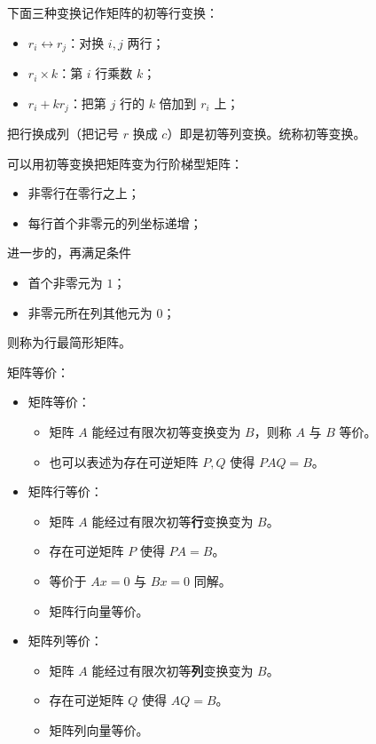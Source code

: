 下面三种变换记作矩阵的初等行变换：
\begin{itemize}
	\item $r_i \leftrightarrow r_j$：对换 $i, j$ 两行；
	\item $r_i \times k$：第 $i$ 行乘数 $k$；
	\item $r_i + kr_j$：把第 $j$ 行的 $k$ 倍加到 $r_i$ 上；
\end{itemize}
把行换成列（把记号 $r$ 换成 $c$）即是初等列变换。统称初等变换。

可以用初等变换把矩阵变为行阶梯型矩阵：
\begin{itemize}
	\item 非零行在零行之上；
	\item 每行首个非零元的列坐标递增；
\end{itemize}
进一步的，再满足条件
\begin{itemize}
	\item 首个非零元为 $1$；
	\item 非零元所在列其他元为 $0$；
\end{itemize}
则称为行最简形矩阵。

矩阵等价：
\begin{itemize}
	\item 矩阵等价：
	      \begin{itemize}
		      \item 矩阵 $A$ 能经过有限次初等变换变为 $B$，则称 $A$ 与 $B$ 等价。
		      \item 也可以表述为存在可逆矩阵 $P,Q$ 使得 $PAQ = B$。
	      \end{itemize}
	\item 矩阵行等价：
	      \begin{itemize}
		      \item 矩阵 $A$ 能经过有限次初等\textbf{行}变换变为 $B$。
		      \item 存在可逆矩阵 $P$ 使得 $PA = B$。
		      \item 等价于 $Ax=0$ 与 $Bx=0$ 同解。
		      \item 矩阵行向量等价。
	      \end{itemize}
	\item 矩阵列等价：
	      \begin{itemize}
		      \item 矩阵 $A$ 能经过有限次初等\textbf{列}变换变为 $B$。
		      \item 存在可逆矩阵 $Q$ 使得 $AQ = B$。
		      \item 矩阵列向量等价。
	      \end{itemize}
\end{itemize}


